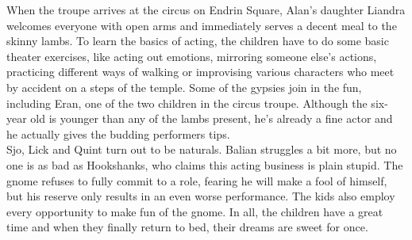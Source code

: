 When the troupe arrives at the circus on Endrin Square, Alan's daughter Liandra welcomes everyone with open arms and immediately serves a decent meal to the skinny lambs. To learn the basics of acting, the children have to do some basic theater exercises, like acting out emotions, mirroring someone else's actions, practicing different ways of walking or improvising various characters who meet by accident on a steps of the temple. Some of the gypsies join in the fun, including Eran, one of the two children in the circus troupe. Although the six-year old is younger than any of the lambs present, he's already a fine actor and he actually gives the budding performers tips.\\

Sjo, Lick and Quint turn out to be naturals. Balian struggles a bit more, but no one is as bad as Hookshanks, who claims this acting business is plain stupid. The gnome refuses to fully commit to a role, fearing he will make a fool of himself, but his reserve only results in an even worse performance. The kids also employ every opportunity to make fun of the gnome. In all, the children have a great time and when they finally return to bed, their dreams are sweet for once.\\

